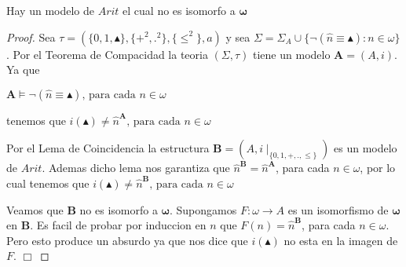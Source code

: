   \begin{proposition}
    Hay un modelo de \(Arit\) el cual no es isomorfo a \(\mathbf{\omega }\)
  \end{proposition}
  \begin{proof}
    Sea \(\tau =(\{0,1,\blacktriangle \},\{+^{2},.^{2}\},\{\leq ^{2}\},a)\) y sea \( \Sigma =\Sigma _{A}\cup \{\lnot (\widehat{n}\equiv \blacktriangle ):n\in \omega \}\). Por el Teorema de Compacidad la teoria \((\Sigma ,\tau )\) tiene un modelo \(\mathbf{A}=(A,i)\). Ya que

    \(\displaystyle \mathbf{A}\vDash \lnot (\widehat{n}\equiv \blacktriangle )\text{, para cada } n\in \omega \)

    tenemos que
    \(\displaystyle i(\blacktriangle )\neq \widehat{n}^{\mathbf{A}}\text{, para cada }n\in \omega \)

    Por el Lema de Coincidencia la estructura \(\mathbf{B}=(A,i\mid _{\{0,1,+,.,\leq \}})\) es un modelo de \(Arit\). Ademas dicho lema nos garantiza que \(\widehat{n}^{\mathbf{B}}=\widehat{n}^{\mathbf{A}}\), para cada \(n\in \omega \), por lo cual tenemos que
    \(\displaystyle i(\blacktriangle )\neq \widehat{n}^{\mathbf{B}}\text{, para cada }n\in \omega \)

    Veamos que \(\mathbf{B}\) no es isomorfo a \(\mathbf{\omega }\). Supongamos \( F:\omega \rightarrow A\) es un isomorfismo de \(\mathbf{\omega }\) en \(\mathbf{B }\). Es facil de probar por induccion en \(n\) que \(F(n)=\widehat{n}^{\mathbf{B} }\), para cada \(n\in \omega \). Pero esto produce un absurdo ya que nos dice que \(i(\blacktriangle )\) no esta en la imagen de \(F\). \(\Box\)
  \end{proof}


